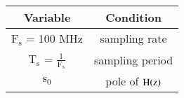 \begin{tabular}{|c|c|}
    \hline
        Variable & Condition \\
    \hline
         $\text{F}_\text{s}$ = 100 MHz & sampling rate \\
    \hline
         $\text{T}_\text{s}$ = $\frac{1}{\text{F}_\text{s}}$ & sampling period \\
    \hline
       $\text{s}_0$ & pole of $\text{H\ensuremath{\left(\text{z}\right)}}$ \\
    \hline
\end{tabular}
